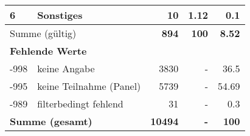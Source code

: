 \begin{longtable}{lXrrr}
     6 &
     \multicolumn{1}{X}{ Sonstiges   } &


       \num{10} &
       \num[round-mode=places,round-precision=2]{1,12} &
         \num[round-mode=places,round-precision=2]{0,1} \\
     \midrule
     \multicolumn{2}{l}{Summe (gültig)} &
       \textbf{\num{894}} &
     \textbf{100} &
       \textbf{\num[round-mode=places,round-precision=2]{8,52}} \\
     \multicolumn{5}{l}{\textbf{Fehlende Werte}}\\
       -998 &
       keine Angabe &
         \num{3830} &
        - &
         \num[round-mode=places,round-precision=2]{36,5} \\
       -995 &
       keine Teilnahme (Panel) &
         \num{5739} &
        - &
         \num[round-mode=places,round-precision=2]{54,69} \\
       -989 &
       filterbedingt fehlend &
         \num{31} &
        - &
         \num[round-mode=places,round-precision=2]{0,3} \\
     \midrule
     \multicolumn{2}{l}{\textbf{Summe (gesamt)}} &
          \textbf{\num{10494}} &
        \textbf{-} &
        \textbf{100} \\
     \bottomrule
     \end{longtable}
     

